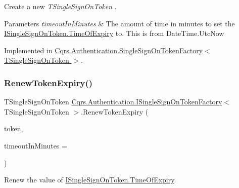 Create a new {\itshape T\+Single\+Sign\+On\+Token} . 


\begin{DoxyParams}{Parameters}
{\em timeout\+In\+Minutes} & The amount of time in minutes to set the \hyperlink{interfaceCqrs_1_1Authentication_1_1ISingleSignOnToken_a50af484569cc78f88acb01f1938a7cd8_a50af484569cc78f88acb01f1938a7cd8}{I\+Single\+Sign\+On\+Token.\+Time\+Of\+Expiry} to. This is from Date\+Time.\+Utc\+Now\\
\hline
\end{DoxyParams}


Implemented in \hyperlink{classCqrs_1_1Authentication_1_1SingleSignOnTokenFactory_ab4d01a3600dbe9aa358cd93c98ccf281_ab4d01a3600dbe9aa358cd93c98ccf281}{Cqrs.\+Authentication.\+Single\+Sign\+On\+Token\+Factory$<$ T\+Single\+Sign\+On\+Token $>$}.

\mbox{\label{interfaceCqrs_1_1Authentication_1_1ISingleSignOnTokenFactory_ab436004ad1631140f7a58927cbacd8c4_ab436004ad1631140f7a58927cbacd8c4}} 
\subsubsection{\texorpdfstring{Renew\+Token\+Expiry()}{RenewTokenExpiry()}}
{\footnotesize\ttfamily T\+Single\+Sign\+On\+Token \hyperlink{interfaceCqrs_1_1Authentication_1_1ISingleSignOnTokenFactory}{Cqrs.\+Authentication.\+I\+Single\+Sign\+On\+Token\+Factory}$<$ T\+Single\+Sign\+On\+Token $>$.Renew\+Token\+Expiry (\begin{DoxyParamCaption}\item[{T\+Single\+Sign\+On\+Token}]{token,  }\item[{int}]{timeout\+In\+Minutes = {} }\end{DoxyParamCaption})}



Renew the value of \hyperlink{interfaceCqrs_1_1Authentication_1_1ISingleSignOnToken_a50af484569cc78f88acb01f1938a7cd8_a50af484569cc78f88acb01f1938a7cd8}{I\+Single\+Sign\+On\+Token.\+Time\+Of\+Expiry}. 


